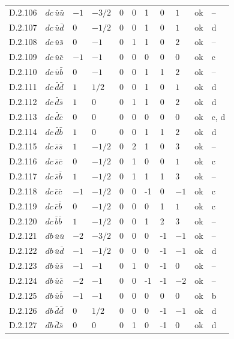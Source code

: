 {\begin{longtable}{@{}llllllllll>{\raggedright\arraybackslash}p{2.0cm}@{}}
D.2.106 & $dc\,\bar{u}\bar{u}$ & $-1$ & $-3/2$ & $0$ & 0 & 1 & 0 & $1$ & ok & -- \\
D.2.107 & $dc\,\bar{u}\bar{d}$ & $0$ & $-1/2$ & $0$ & 0 & 1 & 0 & $1$ & ok & d \\
D.2.108 & $dc\,\bar{u}\bar{s}$ & $0$ & $-1$ & $0$ & 1 & 1 & 0 & $2$ & ok & -- \\
D.2.109 & $dc\,\bar{u}\bar{c}$ & $-1$ & $-1$ & $0$ & 0 & 0 & 0 & $0$ & ok & c \\
D.2.110 & $dc\,\bar{u}\bar{b}$ & $0$ & $-1$ & $0$ & 0 & 1 & 1 & $2$ & ok & -- \\
D.2.111 & $dc\,\bar{d}\bar{d}$ & $1$ & $1/2$ & $0$ & 0 & 1 & 0 & $1$ & ok & d \\
D.2.112 & $dc\,\bar{d}\bar{s}$ & $1$ & $0$ & $0$ & 1 & 1 & 0 & $2$ & ok & d \\
D.2.113 & $dc\,\bar{d}\bar{c}$ & $0$ & $0$ & $0$ & 0 & 0 & 0 & $0$ & ok & c, d \\
D.2.114 & $dc\,\bar{d}\bar{b}$ & $1$ & $0$ & $0$ & 0 & 1 & 1 & $2$ & ok & d \\
D.2.115 & $dc\,\bar{s}\bar{s}$ & $1$ & $-1/2$ & $0$ & 2 & 1 & 0 & $3$ & ok & -- \\
D.2.116 & $dc\,\bar{s}\bar{c}$ & $0$ & $-1/2$ & $0$ & 1 & 0 & 0 & $1$ & ok & c \\
D.2.117 & $dc\,\bar{s}\bar{b}$ & $1$ & $-1/2$ & $0$ & 1 & 1 & 1 & $3$ & ok & -- \\
D.2.118 & $dc\,\bar{c}\bar{c}$ & $-1$ & $-1/2$ & $0$ & 0 & -1 & 0 & $-1$ & ok & c \\
D.2.119 & $dc\,\bar{c}\bar{b}$ & $0$ & $-1/2$ & $0$ & 0 & 0 & 1 & $1$ & ok & c \\
D.2.120 & $dc\,\bar{b}\bar{b}$ & $1$ & $-1/2$ & $0$ & 0 & 1 & 2 & $3$ & ok & -- \\
D.2.121 & $db\,\bar{u}\bar{u}$ & $-2$ & $-3/2$ & $0$ & 0 & 0 & -1 & $-1$ & ok & -- \\
D.2.122 & $db\,\bar{u}\bar{d}$ & $-1$ & $-1/2$ & $0$ & 0 & 0 & -1 & $-1$ & ok & d \\
D.2.123 & $db\,\bar{u}\bar{s}$ & $-1$ & $-1$ & $0$ & 1 & 0 & -1 & $0$ & ok & -- \\
D.2.124 & $db\,\bar{u}\bar{c}$ & $-2$ & $-1$ & $0$ & 0 & -1 & -1 & $-2$ & ok & -- \\
D.2.125 & $db\,\bar{u}\bar{b}$ & $-1$ & $-1$ & $0$ & 0 & 0 & 0 & $0$ & ok & b \\
D.2.126 & $db\,\bar{d}\bar{d}$ & $0$ & $1/2$ & $0$ & 0 & 0 & -1 & $-1$ & ok & d \\
D.2.127 & $db\,\bar{d}\bar{s}$ & $0$ & $0$ & $0$ & 1 & 0 & -1 & $0$ & ok & d \\

\end{longtable}}
